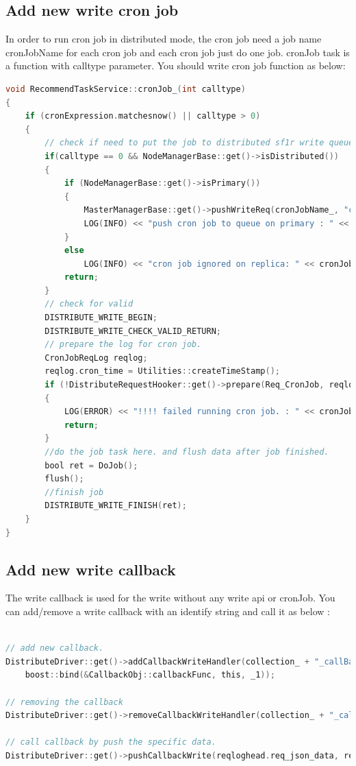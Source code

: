 \subsection{Add new write cron job}
In order to run cron job in distributed mode, the cron job need a job name cronJobName for each cron job and each cron job just do one job. cronJob task is a function with calltype parameter. You should write cron job function as below:
\begin{lstlisting}[language=C]
void RecommendTaskService::cronJob_(int calltype)
{
    if (cronExpression.matchesnow() || calltype > 0)
    {
        // check if need to put the job to distributed sf1r write queue.
        if(calltype == 0 && NodeManagerBase::get()->isDistributed())
        {
            if (NodeManagerBase::get()->isPrimary())
            {
                MasterManagerBase::get()->pushWriteReq(cronJobName_, "cron");
                LOG(INFO) << "push cron job to queue on primary : " << cronJobName_;
            }
            else
                LOG(INFO) << "cron job ignored on replica: " << cronJobName_;
            return;
        }
        // check for valid
        DISTRIBUTE_WRITE_BEGIN;
        DISTRIBUTE_WRITE_CHECK_VALID_RETURN;
        // prepare the log for cron job.
        CronJobReqLog reqlog;
        reqlog.cron_time = Utilities::createTimeStamp();
        if (!DistributeRequestHooker::get()->prepare(Req_CronJob, reqlog))
        {
            LOG(ERROR) << "!!!! failed running cron job. : " << cronJobName_ << std::endl;
            return;
        }
        //do the job task here. and flush data after job finished. 
        bool ret = DoJob();
        flush();
        //finish job
        DISTRIBUTE_WRITE_FINISH(ret);
    }
}
\end{lstlisting}

\subsection{Add new write callback}
The write callback is used for the write without any write api or cronJob. You can add/remove a write callback with an identify string and call it as below :

\begin{lstlisting}[language=C]

// add new callback.
DistributeDriver::get()->addCallbackWriteHandler(collection_ + "_callBackFuncName",
    boost::bind(&CallbackObj::callbackFunc, this, _1));

// removing the callback
DistributeDriver::get()->removeCallbackWriteHandler(collection_ + "_callBackFuncName");

// call callback by push the specific data.
DistributeDriver::get()->pushCallbackWrite(reqloghead.req_json_data, reqdata);

\end{lstlisting}

